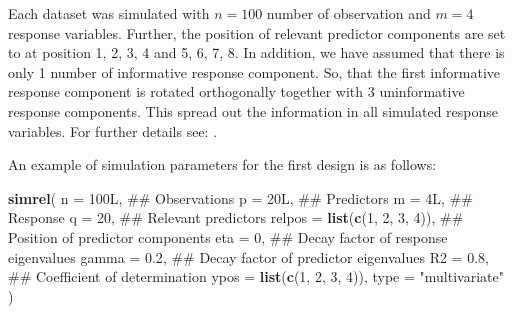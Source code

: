 \documentclass[12pt,3p,authoryear]{elsarticle}
\newenvironment{Shaded}{\begin{snugshade}}{\end{snugshade}}
\newcommand{\KeywordTok}[1]{\textcolor[rgb]{0.13,0.29,0.53}{\textbf{#1}}}
\newcommand{\DataTypeTok}[1]{\textcolor[rgb]{0.13,0.29,0.53}{#1}}
\newcommand{\DecValTok}[1]{\textcolor[rgb]{0.00,0.00,0.81}{#1}}
\newcommand{\FloatTok}[1]{\textcolor[rgb]{0.00,0.00,0.81}{#1}}
\newcommand{\StringTok}[1]{\textcolor[rgb]{0.31,0.60,0.02}{#1}}
\newcommand{\NormalTok}[1]{#1}
\providecommand{\tightlist}{%
  \setlength{\itemsep}{0pt}\setlength{\parskip}{0pt}}
\begin{document}
\begin{description}
\tightlist
\item[\textbf{Common parameters:}]
Each dataset was simulated with \(n = 100\) number of observation and
\(m = 4\) response variables. Further, the position of relevant
predictor components are set to at position 1, 2, 3, 4 and 5, 6, 7, 8.
In addition, we have assumed that there is only 1 number of informative
response component. So, that the first informative response component is
rotated orthogonally together with 3 uninformative response components.
This spread out the information in all simulated response variables. For
further details see: \citep{Rimal_2018}.
\end{description}

An example of simulation parameters for the first design is as follows:

\begin{Shaded}
\begin{Highlighting}[]
\KeywordTok{simrel}\NormalTok{(}
  \DataTypeTok{n      =}\NormalTok{ 100L,                  ## Observations}
  \DataTypeTok{p      =}\NormalTok{ 20L,                   ## Predictors}
  \DataTypeTok{m      =}\NormalTok{ 4L,                    ## Response}
  \DataTypeTok{q      =} \DecValTok{20}\NormalTok{,                    ## Relevant predictors}
  \DataTypeTok{relpos =} \KeywordTok{list}\NormalTok{(}\KeywordTok{c}\NormalTok{(}\DecValTok{1}\NormalTok{, }\DecValTok{2}\NormalTok{, }\DecValTok{3}\NormalTok{, }\DecValTok{4}\NormalTok{)),   ## Position of predictor components}
  \DataTypeTok{eta    =} \DecValTok{0}\NormalTok{,                     ## Decay factor of response eigenvalues}
  \DataTypeTok{gamma  =} \FloatTok{0.2}\NormalTok{,                   ## Decay factor of predictor eigenvalues}
  \DataTypeTok{R2     =} \FloatTok{0.8}\NormalTok{,                   ## Coefficient of determination}
  \DataTypeTok{ypos   =} \KeywordTok{list}\NormalTok{(}\KeywordTok{c}\NormalTok{(}\DecValTok{1}\NormalTok{, }\DecValTok{2}\NormalTok{, }\DecValTok{3}\NormalTok{, }\DecValTok{4}\NormalTok{)), }
  \DataTypeTok{type   =} \StringTok{"multivariate"}
\NormalTok{)}
\end{Highlighting}
\end{Shaded}
\end{document}
